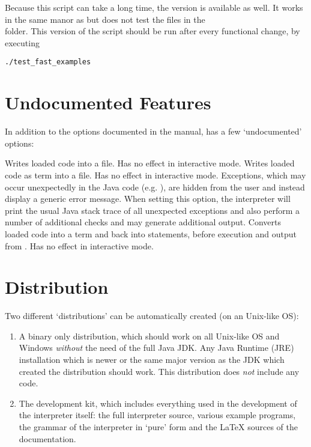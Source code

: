 Because this script can take a long time, the  version is available as well.
It works in the same manor as  but does not test the files in the\\
 folder.
This version of the script should be run after every functional change, by executing

\begin{lstlisting}[frame=none,numbers=none]
./test_fast_examples
\end{lstlisting}

\section{Undocumented Features}

In addition to the options documented in the manual, \setlX{} has a few `undocumented' options:

\begin{itemize}
          {Writes loaded code into a file. Has no effect in interactive mode.}
          {Writes loaded code as term into a file. Has no effect in interactive mode.}
          {Exceptions, which may occur unexpectedly in the Java code (e.g. ), are hidden from the user and instead display a generic error message.
        When setting this option, the interpreter will print the usual Java stack trace of all unexpected exceptions and also perform a number of additional checks and may generate additional output.}
          {Converts loaded code into a term and back into statements, before execution and output from .  Has no effect in interactive mode.}
\end{itemize}

\section{Distribution}

Two different `distributions' can be automatically created (on an Unix-like OS):

\begin{enumerate}
    \item A binary only distribution, which should work on all Unix-like OS and Windows \emph{without} the need of the full Java JDK.
        Any Java Runtime (JRE) installation which is newer or the same major version as the JDK which created the distribution should work.
        This distribution does \emph{not} include any \SetlX{} code.

    \item The development kit, which includes everything used in the development of the interpreter itself: the full interpreter source, various \SetlX{} example programs, the grammar of the interpreter in `pure' form and the \LaTeX{} sources of the documentation.
\end{enumerate}

